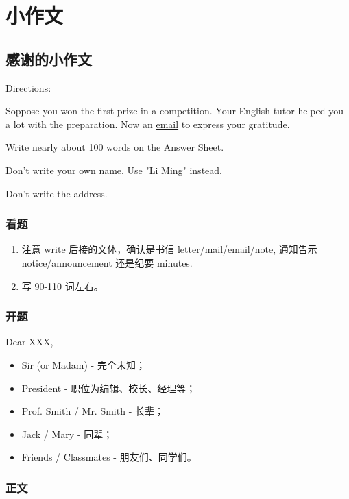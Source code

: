\chapter{小作文}

\section{感谢的小作文}

\noindent Directions:

Soppose you won the first prize in a competition. Your English tutor helped you a lot 
with the preparation. Now  an \underline{email} to express your gratitude.

Write nearly about 100 words on the Answer Sheet.

Don't write your own name. Use "Li Ming" instead.

Don't write the address.

\subsection{看题}

\begin{enumerate}
    \item 注意 write 后接的文体，确认是书信 letter/mail/email/note, 通知告示
    notice/announcement 还是纪要 minutes.
    \item 写 90-110 词左右。
\end{enumerate}

\subsection{开题}

\noindent Dear XXX,

\begin{itemize}
    \item Sir (or Madam) - 完全未知；
    \item President - 职位为编辑、校长、经理等；
    \item Prof. Smith / Mr. Smith - 长辈；
    \item Jack / Mary - 同辈；
    \item Friends / Classmates - 朋友们、同学们。 
\end{itemize}

\subsection{正文}

